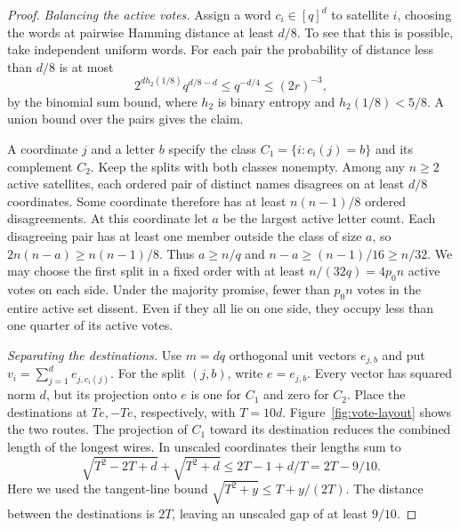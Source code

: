 \begin{proof}
\emph{Balancing the active votes.}
Assign a word \(c_i\in[q]^d\) to satellite \(i\), choosing the words at
pairwise Hamming distance at least \(d/8\). To see that this is
possible, take independent uniform words. For each pair the probability
of distance less than \(d/8\) is at most
\[
  2^{d h_2(1/8)} q^{d/8-d}\le q^{-d/4}\le (2r)^{-3},
\]
by the binomial sum bound, where \(h_2\) is binary entropy and
\(h_2(1/8)<5/8\). A union bound over the pairs gives the claim.

A coordinate \(j\) and a letter \(b\) specify the class
\(C_1=\{i:c_i(j)=b\}\) and its complement \(C_2\). Keep the splits
with both classes nonempty. Among any \(n\ge2\) active satellites,
each ordered pair of distinct names disagrees on at least \(d/8\)
coordinates. Some coordinate therefore has at least \(n(n-1)/8\)
ordered disagreements. At this coordinate let \(a\) be the largest
active letter count. Each disagreeing pair has at least one member
outside the class of size \(a\), so \(2n(n-a)\ge n(n-1)/8\).
Thus \(a\ge n/q\) and \(n-a\ge(n-1)/16\ge n/32\).
We may choose the first split in a fixed order with at least
\(n/(32q)=4p_0 n\) active votes on each side. Under the majority
promise, fewer than \(p_0n\) votes in the entire active set dissent.
Even if they all lie on one side, they occupy less than one quarter
of its active votes.

\emph{Separating the destinations.}
Use \(m=dq\) orthogonal unit vectors \(e_{j,b}\) and put
\(v_i=\sum_{j=1}^d e_{j,c_i(j)}\). For the split \((j,b)\), write
\(e=e_{j,b}\). Every vector has squared norm \(d\), but its projection
onto \(e\) is one for \(C_1\) and zero for \(C_2\). Place the
destinations at \(Te,-Te\), respectively, with \(T=10d\).
Figure~\ref{fig:vote-layout} shows the two routes. The projection of
\(C_1\) toward its destination reduces the combined length of the
longest wires. In unscaled coordinates their lengths sum to
\[
   \sqrt{T^2-2T+d}+\sqrt{T^2+d}
      \le 2T-1+d/T=2T-9/10 .
\]
Here we used the tangent-line bound
\(\sqrt{T^2+y}\le T+y/(2T)\). The distance between the destinations
is \(2T\), leaving an unscaled gap of at least \(9/10\).


\end{proof}
